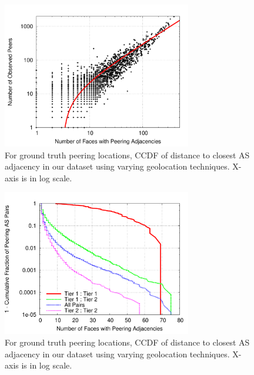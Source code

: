 \begin{figure}[tb]
\centering
\includegraphics[width=3.25in]{scatter}
\caption[]{For ground truth peering locations, CCDF of distance to closest AS adjacency in our dataset using varying geolocation techniques. X-axis is in log scale.} 
\end{figure}


\begin{figure}[tb]
\centering
\includegraphics[width=3.25in]{peering}
\caption[]{For ground truth peering locations, CCDF of distance to closest AS adjacency in our dataset using varying geolocation techniques. X-axis is in log scale.} 
\end{figure}



